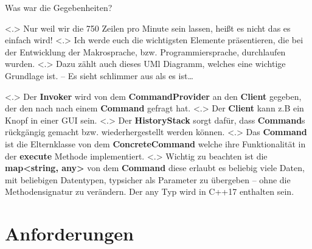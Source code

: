 \begin{frame}{Was war die Gegebenheiten?}
\begin{itemize}[<+- | alert@+>]
\begin{uncoverenv}
\begin{uncoverenv}
%
          \end{uncoverenv}%
              \note[item]<.>{
                Nur weil wir die 750 Zeilen pro Minute sein lassen, heißt es nicht das es einfach wird!
              }
              \note[item]<.>{
                Ich werde euch die wichtigsten Elemente präsentieren, die bei der Entwicklung der Makrosprache, bzw. Programmiersprache, durchlaufen wurden.
              }
              \note[item]<.>{
                Dazu zählt auch dieses UMl Diagramm, welches eine wichtige Grundlage ist. -- Es sieht schlimmer aus als es ist\ldots
              }
          \action{}
        \end{uncoverenv}
            \note[item]<.>{
              Der \textbf{Invoker} wird von dem \textbf{CommandProvider} an den \textbf{Client} gegeben, der den nach nach einem \textbf{Command} gefragt hat.
            }
            \note[item]<.>{
              Der \textbf{Client} kann z.B ein Knopf in einer GUI sein.
            }
            \note[item]<.>{
              Der \textbf{HistoryStack} sorgt dafür, dass \textbf{Command}s rückgängig gemacht bzw. wiederhergestellt werden können.
            }
            \note[item]<.>{
              Das \textbf{Command} ist die Elternklasse von dem \textbf{ConcreteCommand} welche ihre Funktionalität in der \textbf{execute} Methode implementiert.
            }
            \note[item]<.>{
              Wichtig zu beachten ist die \textbf{map<string, any>} von dem \textbf{Command} diese erlaubt es beliebig viele Daten, mit beliebigen Datentypen, typsicher als Parameter zu übergeben -- ohne die Methodensignatur zu verändern. Der any Typ wird in C++17 enthalten sein.
            }
    \end{itemize}
  \end{frame}

\section{Anforderungen}

